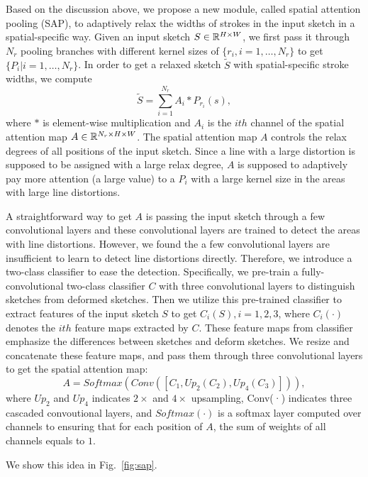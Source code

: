 Based on the discussion above, we propose a new module, called spatial attention pooling (SAP), to adaptively relax the widths of strokes in the input sketch in a spatial-specific way. 
Given an input sketch $S\in {\mathbb{R}}^{H\times W}$, we first pass it through $N_r$ pooling branches with different kernel sizes of $\{r_i, i=1,\ldots, N_r\}$ to get $\{P_{i}| i=1,\ldots,N_r\}$. 
In order to get a relaxed sketch $\tilde{S}$ with spatial-specific stroke widths, we compute
%	
\begin{equation}
\tilde{S}=\sum_{i=1}^{N_r} A_i * P_{r_i}(s),
\end{equation}
%
where $*$ is element-wise multiplication and $A_i$ is the $ith$ channel of the spatial attention map $A\in {\mathbb{R}}^{N_r\times H\times W}$.
The spatial attention map $A$ controls the relax degrees of all positions of the input sketch.
Since a line with a large distortion is supposed to be assigned with a large relax degree, $A$ is supposed to adaptively pay more attention (a large value) to a $P_i$ with a large kernel size in the areas with large line distortions.
%

%
A straightforward way to get $A$ is passing the input sketch through a few convolutional layers and these convolutional layers are trained to detect the areas with line distortions. However, we found the a few convolutional layers are insufficient to learn to detect line distortions directly. Therefore, we introduce a two-class classifier to ease the detection. Specifically, we pre-train a fully-convolutional two-class classifier $C$ with three convolutional layers to distinguish sketches from deformed sketches. Then we utilize this pre-trained classifier to extract features of the input sketch $S$ to get ${C_i(S), i=1,2,3}$, where $C_i(·)$ denotes the $ith$ feature maps extracted by $C$. These feature maps from classifier emphasize the differences between sketches and deform sketches. We resize and concatenate these feature maps, and pass them through three convolutional layers to get the spatial attention map:
%	
\begin{equation}
A=Softmax(Conv([C_1, Up_2(C_2), Up_4(C_3)])), 
\end{equation}
%
where $Up_2$ and $Up_4$ indicates $2\times$ and $4\times$ upsampling, Conv(·) indicates three cascaded convoutional layers, and $Softmax(·)$ is a softmax layer computed over channels to ensuring that for each position of $A$, the sum of weights of all channels equals to $1$.



We show this idea in Fig.~\ref{fig:sap}.




